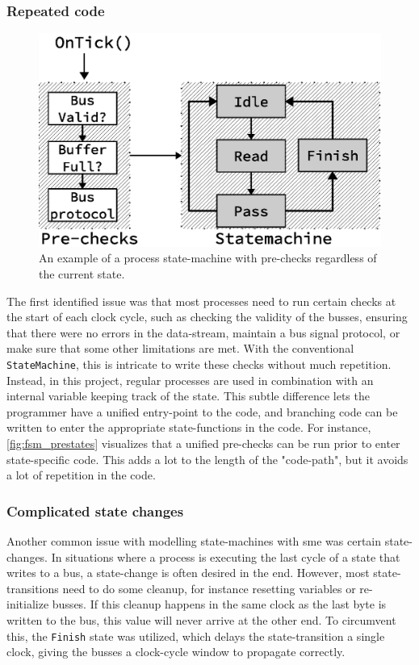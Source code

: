 \subsubsection{Repeated code}
\begin{figure}
\centering
\includegraphics[width=\linewidth]{discussion/fsm_prestates.eps}
\caption{An example of a process state-machine with pre-checks regardless of
the current state.}
\label{fig:fsm_prestates}
\end{figure}

The first identified issue was that most processes need to run certain checks at the
start of each clock cycle, such as checking the validity of the busses,
ensuring that there were no errors in the data-stream, maintain a bus signal
protocol, or make sure that some other limitations are met.
With the conventional \texttt{StateMachine}, this is intricate to write these
checks without much repetition. Instead, in this project, regular processes are
used in combination with an internal variable keeping track of the state.
This subtle difference lets the programmer have a unified entry-point to the
code, and branching code can be written to enter the appropriate
state-functions in the code.
For instance, \autoref{fig:fsm_prestates} visualizes that a unified
pre-checks can be run prior to enter state-specific code. This adds a lot to
the length of the "code-path", but it avoids a lot of repetition in the code.


\subsubsection{Complicated state changes}
Another common issue with modelling state-machines with \gls{sme} was certain
state-changes. In situations where a process is executing the last cycle of a
state that writes to a bus, a state-change is often desired in the end.
However, most state-transitions need to do some cleanup, for instance resetting
variables or re-initialize busses. If this cleanup happens in the same clock as
the last byte is written to the bus, this value will never arrive at the other
end. To circumvent this, the \texttt{Finish} state was utilized, which delays
the state-transition a single clock, giving the busses a clock-cycle window to
propagate correctly.

